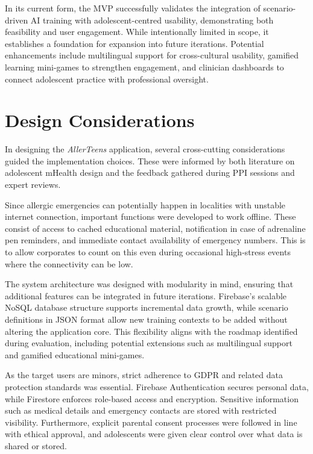 \documentclass[MScCS]{uccthesis}
\begin{document}
In its current form, the MVP successfully validates the integration of scenario-driven AI training with adolescent-centred usability, demonstrating both feasibility and user engagement. While intentionally limited in scope, it establishes a foundation for expansion into future iterations. Potential enhancements include multilingual support for cross-cultural usability, gamified learning mini-games to strengthen engagement, and clinician dashboards to connect adolescent practice with professional oversight.  

\section{Design Considerations}
In designing the \textit{AllerTeens} application, several cross-cutting considerations guided the implementation choices. These were informed by both literature on adolescent mHealth design and the feedback gathered during PPI sessions and expert reviews.

Since allergic emergencies can potentially happen in localities with unstable internet connection, important functions were developed to work offline. These consist of access to cached educational material, notification in case of adrenaline pen reminders, and immediate contact availability of emergency numbers. This is to allow corporates to count on this even during occasional high-stress events where the connectivity can be low.

The system architecture was designed with modularity in mind, ensuring that additional features can be integrated in future iterations. Firebase's scalable NoSQL database structure supports incremental data growth, while scenario definitions in JSON format allow new training contexts to be added without altering the application core. This flexibility aligns with the roadmap identified during evaluation, including potential extensions such as multilingual support and gamified educational mini-games.

As the target users are minors, strict adherence to GDPR and related data protection standards was essential. Firebase Authentication secures personal data, while Firestore enforces role-based access and encryption. Sensitive information such as medical details and emergency contacts are stored with restricted visibility. Furthermore, explicit parental consent processes were followed in line with ethical approval, and adolescents were given clear control over what data is shared or stored.
\end{document}
